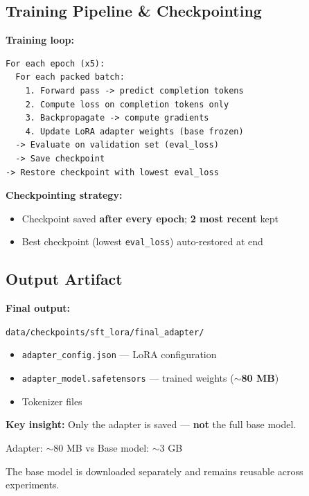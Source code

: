 \subsection{Training Pipeline \& Checkpointing}
\begin{frame}[fragile]{\insertsubsection}
  \textbf{Training loop:}
\begin{verbatim}
For each epoch (x5):
  For each packed batch:
    1. Forward pass -> predict completion tokens
    2. Compute loss on completion tokens only
    3. Backpropagate -> compute gradients
    4. Update LoRA adapter weights (base frozen)
  -> Evaluate on validation set (eval_loss)
  -> Save checkpoint
-> Restore checkpoint with lowest eval_loss
\end{verbatim}

  \textbf{Checkpointing strategy:}
  \begin{itemize}
    \item Checkpoint saved \textbf{after every epoch}; \textbf{2 most recent} kept
    \item Best checkpoint (lowest \texttt{eval\_loss}) auto-restored at end
  \end{itemize}
\end{frame}

\subsection{Output Artifact}
\begin{frame}{\insertsubsection}
  \textbf{Final output:}
  \begin{center}
    \texttt{data/checkpoints/sft\_lora/final\_adapter/}
  \end{center}

  \begin{itemize}
    \item \texttt{adapter\_config.json} --- LoRA configuration
    \item \texttt{adapter\_model.safetensors} --- trained weights (\textbf{$\sim$80 MB})
    \item Tokenizer files
  \end{itemize}

  \vspace{0.3cm}
  \textbf{Key insight:} Only the adapter is saved --- \textbf{not} the full base model.

  \begin{center}
    Adapter: $\sim$80 MB \quad vs \quad Base model: $\sim$3 GB
  \end{center}

  The base model is downloaded separately and remains reusable across experiments.
\end{frame}

